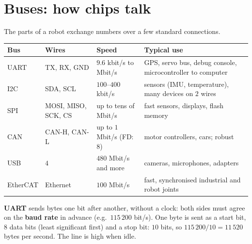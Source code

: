 \section*{Buses: how chips talk}
The parts of a robot exchange numbers over a few standard connections.
\begin{center}
\renewcommand{\arraystretch}{1.25}
\begin{tabular}{p{1.8cm}p{2.6cm}p{3.0cm}p{5.2cm}}
\textbf{Bus} & \textbf{Wires} & \textbf{Speed} & \textbf{Typical use}\\ \hline
UART & TX, RX, GND & $9.6$ kbit/s to Mbit/s & GPS, servo bus, debug console, microcontroller to computer\\
I2C & SDA, SCL & $100$--$400$ kbit/s & sensors (IMU, temperature), many devices on $2$ wires\\
SPI & MOSI, MISO, SCK, CS & up to tens of Mbit/s & fast sensors, displays, flash memory\\
CAN & CAN-H, CAN-L & up to $1$ Mbit/s (FD: $8$) & motor controllers, cars; robust\\
USB & $4$ & $480$ Mbit/s and more & cameras, microphones, adapters\\
EtherCAT & Ethernet & $100$ Mbit/s & fast, synchronised industrial and robot joints\\
\end{tabular}
\end{center}
\textbf{UART} sends bytes one bit after another, without a clock: both sides must agree on the \textbf{baud rate} in advance (e.g.\ $115\,200$ bit/s). One byte is sent as a start bit, $8$ data bits (least significant first) and a stop bit: $10$ bits, so $115\,200/10=11\,520$ bytes per second. The line is high when idle.
\begin{center}
\label{fig:hw3_uart}
\end{center}
